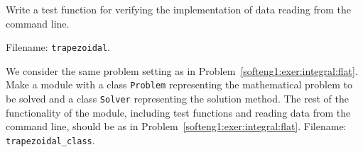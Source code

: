 \documentclass[graybox,sectrefs,envcountresetchap,open=right,final]{svmonodo}
\makeatletter
\newenvironment{doconceexercise}{}{}
\newcounter{doconceexercisecounter}%
\newcommand\listofexercises{
\chapter*{List of Exercises, Problems, and Projects
          \@mkboth{List of Exercises, Problems, and Projects}{List of Exercises, Problems, and Projects}}
\markboth{List of Exercises, Problems, and Projects}{List of Exercises, Problems, and Projects}
\@starttoc{loe}
}
\makeatother
\begin{document}
\begin{doconceexercise}
\begin{Verbatim}[frame=lines,label=\fbox{{\tiny Terminal}},framesep=2.5mm,framerule=0.7pt,fontsize=\fontsize{9pt}{9pt}]
\end{Verbatim}




Write a test function for verifying the implementation of
data reading from the command line.


\noindent Filename: \texttt{trapezoidal}.

\end{doconceexercise}

\begin{doconceexercise}

                
\label{softeng1:exer:integral:flat2}

We consider the same problem setting as in Problem~\ref{softeng1:exer:integral:flat}. Make a module with a class \texttt{Problem}
representing the mathematical problem to be solved and a class
\texttt{Solver} representing the solution method.  The rest of the
functionality of the module, including test functions and reading data
from the command line, should be as in Problem~\ref{softeng1:exer:integral:flat}.
\noindent Filename: \Verb!trapezoidal_class!.

\end{doconceexercise}
\end{document}
